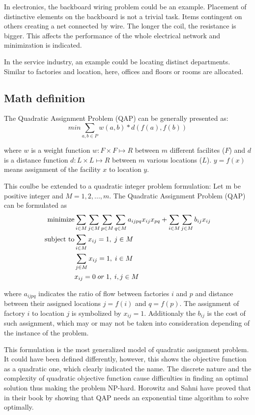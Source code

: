 In electronics, the backboard wiring problem could be an example.
Placement of distinctive elements on the backboard is not a trivial task.
Items contingent on others creating a net connected by wire.
The longer the coil, the resistance is bigger.
This affects the performance of the whole electrical network and minimization is indicated.

In the service industry, an example could be locating distinct departments.
Similar to factories and location, here, offices and floors or rooms are allocated.

\subsection{Math definition}
The Quadratic Assignment Problem (QAP) can be generally presented as:
\begin{equation}
min \sum_{a, b \in P } w(a, b) * d( f(a), f(b))
\end{equation}

where $w$ is a weight function $w: F \times F \mapsto R$ between $m$ different facilites ($F$) and $d$ is a distance function $d: L \times L \mapsto R$ between $m$ various locations ($L$). $y = f(x)$ means assignment of the facility $x$ to location $y$.

This coulbe be extended to a quadratic integer problem formulation:
Let m be positive integer and $M = { 1, 2, ..., m }$. The Quadratic Assignment Problem (QAP) can be formulated as
\begin{align}
  \text{minimize} &\null \sum_{i \in M} \sum_{j \in M} \sum_{p \in M} \sum_{q \in M} a_{ijpq}x_{ij}x_{pq} + \sum_{i \in M} \sum_{j \in M} b_{ij} x_{ij} \\
  \text{subject to} &\null \sum_{i \in M} x_{ij} = 1, \; j \in M \\
  &\null \sum_{j \in M} x_{ij} = 1, \; i \in M \\
  &\null x_{ij} = 0 \; or \; 1, \; i, j \in M
\end{align}

where $a_{ijpq}$ indicates the ratio of flow between factories $i$ and $p$ and distance between their assigned locations $j = f(i)$ and $q = f(p)$.
The assignment of factory $i$ to location $j$ is symbolized by $x_{ij} = 1$.
Additionaly the $b_{ij}$ is the cost of such assignment, which may or may not be taken into consideration depending of the instance of the problem.

This formulation is the most generalized model of quadratic assignment problem.
It could have been defined differently, however, this shows the objective function as a quadratic one, which clearly indicated the name.
The discrete nature and the complexity of quadratic objective function cause difficulties in finding an optimal solution thus making the problem NP-hard.
Horowitz and Sahni have proved that in their book \cite{horowitz1978fundamentals} by showing that QAP needs an exponential time algorithm to solve optimally.


